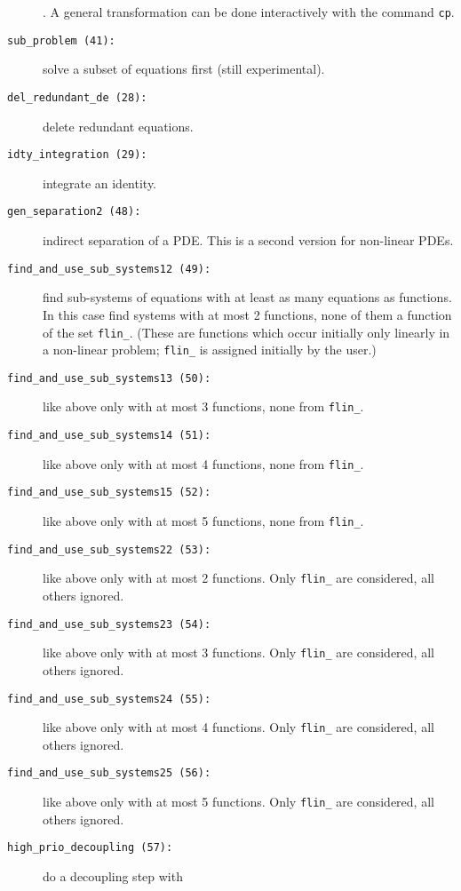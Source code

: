 \begin{description}
  .  A general transformation can be done interactively
  with the command \texttt{cp}.
  \label{crack-m_41}
\item[\texttt{sub\_problem (41):}] solve a subset of equations first
  (still experimental).
  \label{crack-m_28}
\item[\texttt{del\_redundant\_de (28):}] delete redundant equations.
  \label{crack-m_29}
\item[\texttt{idty\_integration (29):}] integrate an identity.
  \label{crack-m_48}
\item[\texttt{gen\_separation2 (48):}] indirect separation of a PDE.
  This is a second version for non-linear PDEs.
  \label{crack-m_49}
\item[\texttt{find\_and\_use\_sub\_systems12 (49):}] find sub-systems
  of equations with at least as many equations as functions.  In this
  case find systems with at most 2 functions, none of them a function
  of the set \texttt{flin\_}.  (These are functions which occur
  initially only linearly in a non-linear problem; \texttt{flin\_} is
  assigned initially by the user.)
  \label{crack-m_50}
\item[\texttt{find\_and\_use\_sub\_systems13 (50):}] like above only
  with at most 3 functions, none from \texttt{flin\_}.
  \label{crack-m_51}
\item[\texttt{find\_and\_use\_sub\_systems14 (51):}] like above only
  with at most 4 functions, none from \texttt{flin\_}.
  \label{crack-m_52}
\item[\texttt{find\_and\_use\_sub\_systems15 (52):}] like above only
  with at most 5 functions, none from \texttt{flin\_}.
  \label{crack-m_53}
\item[\texttt{find\_and\_use\_sub\_systems22 (53):}] like above only
  with at most 2 functions.  Only \texttt{flin\_} are considered, all
  others ignored.
  \label{crack-m_54}
\item[\texttt{find\_and\_use\_sub\_systems23 (54):}] like above only
  with at most 3 functions.  Only \texttt{flin\_} are considered, all
  others ignored.
  \label{crack-m_55}
\item[\texttt{find\_and\_use\_sub\_systems24 (55):}] like above only
  with at most 4 functions.  Only \texttt{flin\_} are considered, all
  others ignored.
  \label{crack-m_56}
\item[\texttt{find\_and\_use\_sub\_systems25 (56):}] like above only
  with at most 5 functions.  Only \texttt{flin\_} are considered, all
  others ignored.
  \label{crack-m_57}
\item[\texttt{high\_prio\_decoupling (57):}] do a decoupling step with

\end{description}
